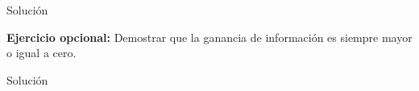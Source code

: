 \documentclass{mulcia_aa}
\begin{document}
\begin{solution}
Solución
\end{solution}

\noindent\hrulefill
\begin{problem}
\textbf{Ejercicio opcional:} Demostrar que la ganancia de información es siempre mayor o igual a cero.
\end{problem}
\begin{solution}
Solución
\end{solution}
\end{document}
